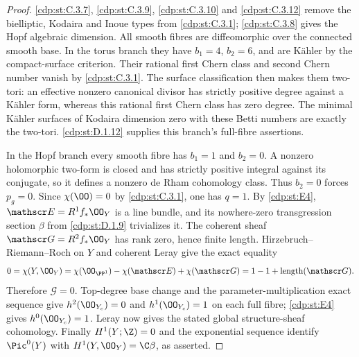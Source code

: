 \begin{proof}
\ref{cdp:st:C.3.7}, \ref{cdp:st:C.3.9}, \ref{cdp:st:C.3.10} and \ref{cdp:st:C.3.12} remove the bielliptic,
Kodaira and Inoue types from \ref{cdp:st:C.3.1}; \ref{cdp:st:C.3.8} gives the Hopf algebraic
dimension. All smooth fibres are diffeomorphic over the
connected smooth base. In the torus branch they have
$b_1=4$, $b_2=6$, and are K\"ahler by the compact-surface
criterion. Their rational first Chern class and second
Chern number vanish by \ref{cdp:st:C.3.1}. The surface classification
then makes them two-tori: an effective nonzero canonical
divisor has strictly positive degree against a K\"ahler
form, whereas this rational first Chern class has zero
degree. The minimal K\"ahler surfaces of Kodaira dimension
zero with these Betti numbers are exactly the two-tori.
\ref{cdp:st:D.1.12} supplies this branch's full-fibre assertions.

In the Hopf branch every smooth fibre has
$b_1=1$ and $b_2=0$. A nonzero holomorphic two-form
is closed and has strictly positive integral against
its conjugate, so it defines a nonzero de Rham
cohomology class. Thus $b_2=0$ forces $p_g=0$.
Since $\chi(\OO)=0$ by \ref{cdp:st:C.3.1}, one has $q=1$.
By \ref{cdp:st:E4}, $\mathscr E=R^1f_*\OO_Y$ is a line bundle,
and its nowhere-zero transgression section $\beta$
from \ref{cdp:st:D.1.9} trivializes it. The coherent sheaf
$\mathscr G=R^2f_*\OO_Y$ has rank zero, hence finite
length. Hirzebruch--Riemann--Roch on $Y$ and coherent
Leray give the exact equality
\[
 0=\chi(Y,\OO_Y)
   =\chi(\OO_{\PP^1})-\chi(\mathscr E)+\chi(\mathscr G)
   =1-1+\operatorname{length}(\mathscr G).
\]
Therefore $\mathscr G=0$. Top-degree base change and
the parameter-multiplication exact sequence give
$h^2(\OO_{Y_c})=0$ and $h^1(\OO_{Y_c})=1$ on each
full fibre; \ref{cdp:st:E4} gives $h^0(\OO_{Y_c})=1$.
Leray now gives the stated global structure-sheaf
cohomology. Finally $H^1(Y;\Z)=0$ and the exponential
sequence identify $\Pic^0(Y)$ with
$H^1(Y,\OO_Y)=\C\beta$, as asserted.
\end{proof}


